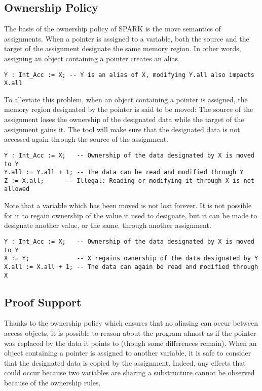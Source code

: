 \documentclass[runningheads]{llncs}
\begin{document}
\subsection{Ownership Policy}
The basis of the ownership policy of SPARK is the move semantics of assignments. When a pointer is assigned to a variable, both the source and the target of the assignment designate the same memory region. In other words, assigning an object containing a pointer creates an alias.
\begin{lstlisting}
Y : Int_Acc := X; -- Y is an alias of X, modifying Y.all also impacts X.all
\end{lstlisting}
To alleviate this problem, when an object containing a pointer is assigned, the memory region designated by the pointer is said to be moved: The source of the assignment loses the ownership of the designated data while the target of the assignment gains it. The tool will make sure that the designated data is not accessed again through the source of the assignment.
\begin{lstlisting}
Y : Int_Acc := X;   -- Ownership of the data designated by X is moved to Y
Y.all := Y.all + 1; -- The data can be read and modified through Y
Z := X.all;      -- Illegal: Reading or modifying it through X is not allowed
\end{lstlisting}
Note that a variable which has been moved is not lost forever. It is not possible for it to regain ownership of the value it used to designate, but it can be made to designate another value, or the same, through another assignment.
\begin{lstlisting}
Y : Int_Acc := X;   -- Ownership of the data designated by X is moved to Y
X := Y;             -- X regains ownership of the data designated by Y
X.all := X.all + 1; -- The data can again be read and modified through X
\end{lstlisting}

\subsection{Proof Support}
Thanks to the ownership policy which ensures that no aliasing can occur between access objects, it is possible to reason about the program almost as if the pointer was replaced by the data it points to (though some differences remain). When an object containing a pointer is assigned to another variable, it is safe to consider that the designated data is copied by the assignment. Indeed, any effects that could occur because two variables are sharing a substructure cannot be observed because of the ownership rules.
\end{document}
